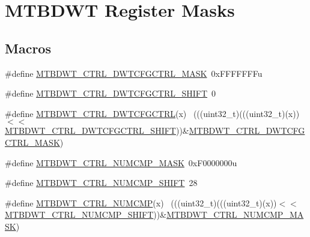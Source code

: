 \hypertarget{group___m_t_b_d_w_t___register___masks}{}\section{M\+T\+B\+D\+WT Register Masks}
\label{group___m_t_b_d_w_t___register___masks}
\subsection*{Macros}
\begin{DoxyCompactItemize}
\item 
\#define \hyperlink{group___m_t_b_d_w_t___register___masks_ga9e40278e7b92b2e6b986112b6e2dddc3}{M\+T\+B\+D\+W\+T\+\_\+\+C\+T\+R\+L\+\_\+\+D\+W\+T\+C\+F\+G\+C\+T\+R\+L\+\_\+\+M\+A\+SK}~0x\+F\+F\+F\+F\+F\+F\+Fu
\item 
\#define \hyperlink{group___m_t_b_d_w_t___register___masks_gad6dd05558d41419cb9f877533730598a}{M\+T\+B\+D\+W\+T\+\_\+\+C\+T\+R\+L\+\_\+\+D\+W\+T\+C\+F\+G\+C\+T\+R\+L\+\_\+\+S\+H\+I\+FT}~0
\item 
\#define \hyperlink{group___m_t_b_d_w_t___register___masks_ga2815d02c2137ac71498ed0ad09c8a72a}{M\+T\+B\+D\+W\+T\+\_\+\+C\+T\+R\+L\+\_\+\+D\+W\+T\+C\+F\+G\+C\+T\+RL}(x)                            ~(((uint32\+\_\+t)(((uint32\+\_\+t)(x))$<$$<$\hyperlink{group___m_t_b_d_w_t___register___masks_gad6dd05558d41419cb9f877533730598a}{M\+T\+B\+D\+W\+T\+\_\+\+C\+T\+R\+L\+\_\+\+D\+W\+T\+C\+F\+G\+C\+T\+R\+L\+\_\+\+S\+H\+I\+FT}))\&\hyperlink{group___m_t_b_d_w_t___register___masks_ga9e40278e7b92b2e6b986112b6e2dddc3}{M\+T\+B\+D\+W\+T\+\_\+\+C\+T\+R\+L\+\_\+\+D\+W\+T\+C\+F\+G\+C\+T\+R\+L\+\_\+\+M\+A\+SK})
\item 
\#define \hyperlink{group___m_t_b_d_w_t___register___masks_ga846eb798600a6cbb83fb5343120b87e6}{M\+T\+B\+D\+W\+T\+\_\+\+C\+T\+R\+L\+\_\+\+N\+U\+M\+C\+M\+P\+\_\+\+M\+A\+SK}~0x\+F0000000u
\item 
\#define \hyperlink{group___m_t_b_d_w_t___register___masks_ga8ae4e5abf11db57b34a826de0cd5e562}{M\+T\+B\+D\+W\+T\+\_\+\+C\+T\+R\+L\+\_\+\+N\+U\+M\+C\+M\+P\+\_\+\+S\+H\+I\+FT}~28
\item 
\#define \hyperlink{group___m_t_b_d_w_t___register___masks_ga99d11503a347139c3f1b007705f709e8}{M\+T\+B\+D\+W\+T\+\_\+\+C\+T\+R\+L\+\_\+\+N\+U\+M\+C\+MP}(x)                                    ~(((uint32\+\_\+t)(((uint32\+\_\+t)(x))$<$$<$\hyperlink{group___m_t_b_d_w_t___register___masks_ga8ae4e5abf11db57b34a826de0cd5e562}{M\+T\+B\+D\+W\+T\+\_\+\+C\+T\+R\+L\+\_\+\+N\+U\+M\+C\+M\+P\+\_\+\+S\+H\+I\+FT}))\&\hyperlink{group___m_t_b_d_w_t___register___masks_ga846eb798600a6cbb83fb5343120b87e6}{M\+T\+B\+D\+W\+T\+\_\+\+C\+T\+R\+L\+\_\+\+N\+U\+M\+C\+M\+P\+\_\+\+M\+A\+SK})

\end{DoxyCompactItemize}
